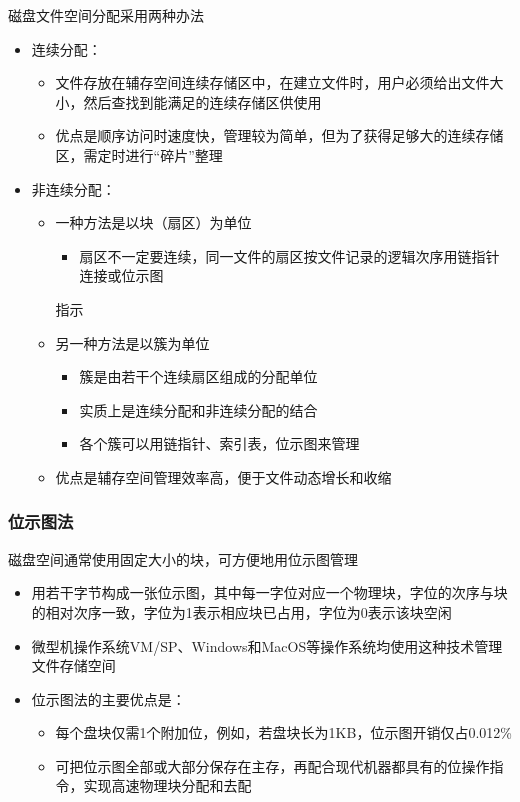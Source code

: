 \documentclass[cs4size,a4paper,10pt]{ctexart}
\begin{document}
	磁盘文件空间分配采用两种办法
	\begin{itemize}
		\item 连续分配：
		\begin{itemize}
			\item 文件存放在辅存空间连续存储区中，在建立文件时，用户必须给出文件大小，然后查找到能满足的连续存储区供使用
			\item 优点是顺序访问时速度快，管理较为简单，但为了获得足够大的连续存储区，需定时进行“碎片”整理
		\end{itemize}
		\item 非连续分配：
		\begin{itemize}
			\item 一种方法是以块（扇区）为单位
			\begin{itemize}
				\item 扇区不一定要连续，同一文件的扇区按文件记录的逻辑次序用链指针连接或位示图
			\end{itemize}指示
			\item 另一种方法是以簇为单位
			\begin{itemize}
				\item 簇是由若干个连续扇区组成的分配单位
				\item 实质上是连续分配和非连续分配的结合
				\item 各个簇可以用链指针、索引表，位示图来管理
			\end{itemize}
			\item 优点是辅存空间管理效率高，便于文件动态增长和收缩
		\end{itemize}
	\end{itemize}

	\subsubsection{位示图法}
	磁盘空间通常使用固定大小的块，可方便地用位示图管理
	\begin{itemize}
		\item 用若干字节构成一张位示图，其中每一字位对应一个物理块，字位的次序与块的相对次序一致，字位为1表示相应块已占用，字位为0表示该块空闲
		\item 微型机操作系统VM/SP、Windows和MacOS等操作系统均使用这种技术管理文件存储空间
		\item 位示图法的主要优点是：
		\begin{itemize}
			\item 每个盘块仅需1个附加位，例如，若盘块长为1KB，位示图开销仅占0.012\%
			\item 可把位示图全部或大部分保存在主存，再配合现代机器都具有的位操作指令，实现高速物理块分配和去配
		\end{itemize}
	\end{itemize}
\end{document}
